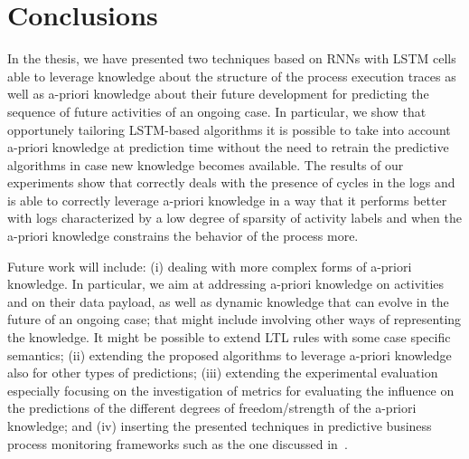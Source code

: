
\section{Conclusions} %
\label{sec:conclusions}

In the thesis, we have presented two techniques based on RNNs with LSTM cells able to leverage knowledge about the structure of the process execution traces as well as a-priori knowledge about their future development for predicting the sequence of future activities of an ongoing case. In particular, we show that opportunely tailoring LSTM-based algorithms it is possible to take into account a-priori knowledge at prediction time without the need to retrain the predictive algorithms in case new knowledge becomes available. The results of our experiments show that \nocycle correctly deals with the presence of cycles in the logs and \protrack is able to correctly leverage a-priori knowledge in a way that it performs better with logs characterized by a low degree of sparsity of activity labels and when the a-priori knowledge constrains the behavior of the process more.

Future work will include: (i) dealing with more complex forms of a-priori knowledge. In particular, we aim at addressing a-priori knowledge on activities and on their data payload, as well as dynamic knowledge that can evolve in the future of an ongoing case; that might include involving other ways of representing the knowledge. It might be possible to extend LTL rules with some case specific semantics;  (ii) extending the proposed algorithms to leverage a-priori knowledge also for other types of predictions; (iii) extending the experimental evaluation especially focusing on the investigation of metrics for evaluating the influence on the predictions of the different degrees of freedom/strength of the a-priori knowledge; and (iv) inserting the presented techniques in predictive business process monitoring frameworks such as the one discussed in~\cite{Di-Francescomarino:2016aa}. 

\newpage

